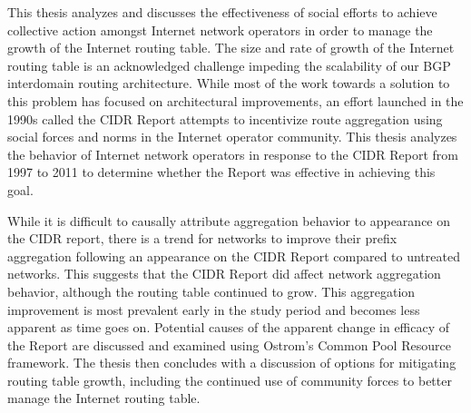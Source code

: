 %
%
%
This thesis analyzes and discusses the effectiveness of social efforts to
achieve collective action amongst Internet network operators in order to manage
the growth of the Internet routing table. The size and rate of growth of the
Internet routing table is an acknowledged challenge impeding the scalability of
our BGP interdomain routing architecture. While most of the work towards a
solution to this problem has focused on architectural improvements, an effort
launched in the 1990s called the CIDR Report attempts to incentivize route
aggregation using social forces and norms in the Internet operator community.
This thesis analyzes the behavior of Internet network operators in response to
the CIDR Report from 1997 to 2011 to determine whether the Report was
effective in achieving this goal.

While it is difficult to causally attribute aggregation behavior to appearance
on the CIDR report, there is a trend for networks to improve their prefix
aggregation following an appearance on the CIDR Report compared to untreated
networks. This suggests that the CIDR Report did affect network aggregation
behavior, although the routing table continued to grow. This aggregation
improvement is most prevalent early in the study period and becomes less
apparent as time goes on. Potential causes of the apparent change in efficacy
of the Report are discussed and examined using Ostrom's Common Pool Resource
framework. The thesis then concludes with a discussion of options for
mitigating routing table growth, including the continued use of community
forces to better manage the Internet routing table.
